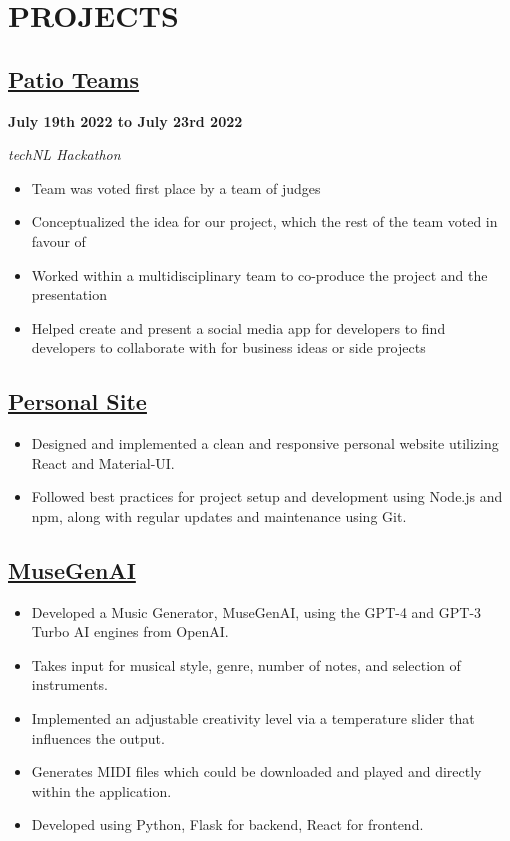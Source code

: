 \documentclass[12pt]{extarticle}
\begin{document}
\section*{PROJECTS}
\subsection*{\href{https://technl.ca/2022/07/28/techfwd-conclusion/}{Patio Teams}
} \hfill \textbf{July 19th 2022 to July 23rd 2022}

\textsl{techNL Hackathon}
\begin{itemize}
	\item Team was voted first place by a team of judges
  \item Conceptualized the idea for our project, which the rest of the team voted in favour of
  \item Worked within a multidisciplinary team to co-produce the project and the presentation
  \item Helped create and present a social media app for developers to find developers to collaborate with for business ideas or side projects
\end{itemize}

\subsection*{\href{https://github.com/Inefy/Me}{Personal Site}
} \hfill
\begin{itemize}
\item Designed and implemented a clean and responsive personal website utilizing React and Material-UI.
\item Followed best practices for project setup and development using Node.js and npm, along with regular updates and maintenance using Git.
\end{itemize}

\subsection*{\href{https://github.com/Inefy/MuseGenAI}{MuseGenAI}
} \hfill
\begin{itemize}
	\item Developed a Music Generator, MuseGenAI, using the GPT-4 and GPT-3 Turbo AI engines from OpenAI.
	\item Takes input for musical style, genre, number of notes, and selection of instruments.
	\item Implemented an adjustable creativity level via a temperature slider that influences the output.
	\item Generates MIDI files which could be downloaded and played and directly within the application.
	\item Developed using Python, Flask for backend, React for frontend.
\end{itemize}
\end{document}
